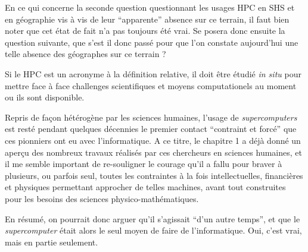 


En ce qui concerne la seconde question questionnant les usages HPC en SHS et en géographie vis à vis de leur \enquote{apparente} absence sur ce terrain, il faut bien noter que cet état de fait n'a pas toujours été vrai. Se posera donc ensuite la question suivante, que s'est il donc passé pour que l'on constate aujourd'hui une telle absence des géographes sur ce terrain ?

Si le HPC est un acronyme à la définition relative, il doit être étudié \textit{in situ} pour mettre face à face challenges scientifiques et moyens computationels au moment ou ils sont disponible.



Repris de façon hétérogène par les sciences humaines, l’usage de \textit{supercomputers} est resté pendant quelques décennies le premier contact \enquote{contraint et forcé} que ces pionniers ont eu avec l'informatique. A ce titre, le chapitre 1 a déjà donné un aperçu des nombreux travaux réalisés par ces chercheurs en sciences humaines, et il me semble important de re-souligner le courage qu'il a fallu pour braver à plusieurs, ou parfois seul, toutes les contraintes à la fois intellectuelles, financières et physiques permettant approcher de telles machines, avant tout construites pour les besoins des sciences physico-mathématiques.

En résumé, on pourrait donc arguer qu'il s'agissait \enquote{d'un autre temps}, et que le \textit{supercomputer} était alors le seul moyen de faire de l'informatique. Oui, c'est vrai, mais en partie seulement.

